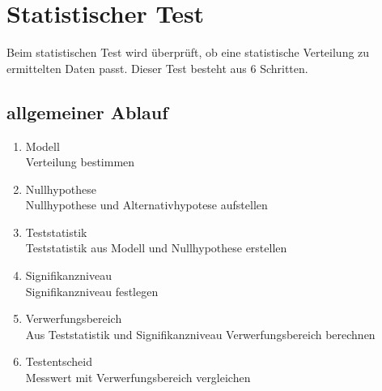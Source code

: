 \section{Statistischer Test}
Beim statistischen Test wird überprüft, ob eine statistische Verteilung zu 
ermittelten Daten passt. Dieser Test besteht aus 6 Schritten. 

\subsection{allgemeiner Ablauf}
\begin{enumerate}
  \item Modell \\
        Verteilung bestimmen
  \item Nullhypothese \\
        Nullhypothese und Alternativhypotese aufstellen
  \item Teststatistik \\
        Teststatistik aus Modell und Nullhypothese erstellen
  \item Signifikanzniveau \\
        Signifikanzniveau festlegen
  \item Verwerfungsbereich \\
        Aus Teststatistik und Signifikanzniveau Verwerfungsbereich berechnen
  \item Testentscheid \\
        Messwert mit Verwerfungsbereich vergleichen
\end{enumerate}

